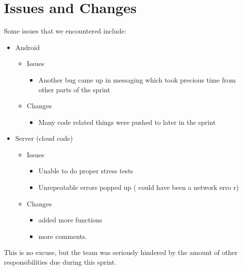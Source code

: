 \documentclass[11pt]{article}
\begin{document}
\section*{Issues and Changes}
Some issues that we encountered include:

	\begin{itemize}
		\item Android
			\begin{itemize}
				\item Issues
				\begin{itemize}
					\item Another bug came up in messaging which took precious time from other parts of the sprint
				\end{itemize}
				
				\item Changes
				\begin{itemize}
					\item Many code related things were pushed to later in the sprint
				\end{itemize}
			\end{itemize}
			
		\item Server (cloud code)
		\begin{itemize}
				\item Issues
				\begin{itemize}
					\item Unable to do proper stress tests
					\item Unrepeatable errors popped up ( could have been a network erro r)		
				\end{itemize}
				
				\item Changes 
				\begin{itemize}
					\item added more functions
					\item more comments.
				\end{itemize}
			\end{itemize}
	\end{itemize}
	This is no excuse, but the team was seriously hindered by the amount of other responsibilities due during this sprint.\\
\end{document}
